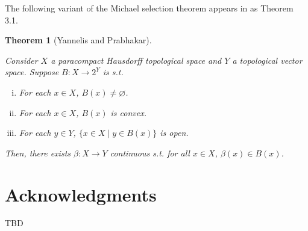 \documentclass[11pt]{article}
\theoremstyle{definition}
\theoremstyle{plain}
\newtheorem{theorem}{Theorem}%
\begin{document}
The following variant of the Michael selection theorem appears in \cite{Yannelis_1983} as Theorem 3.1.

\begin{samepage}
\begin{theorem} [Yannelis and Prabhakar]
\label{thm:selection}

Consider $X$ a paracompact Hausdorff topological space and $Y$ a topological vector space. Suppose $B: X \rightarrow 2^Y$ is s.t.

\begin{enumerate}[i.]

\item For each $x \in X$, $B(x) \ne \varnothing$.
\item For each $x \in X$, $B(x)$ is convex.
\item For each $y \in Y$, $\{x \in X \mid y \in B(x)\}$ is open.

\end{enumerate}

Then, there exists $\beta: X \rightarrow Y$ continuous s.t. for all $x \in X$, $\beta(x) \in B(x)$.

\end{theorem}
\end{samepage}

\section*{Acknowledgments}

TBD



\end{document}

